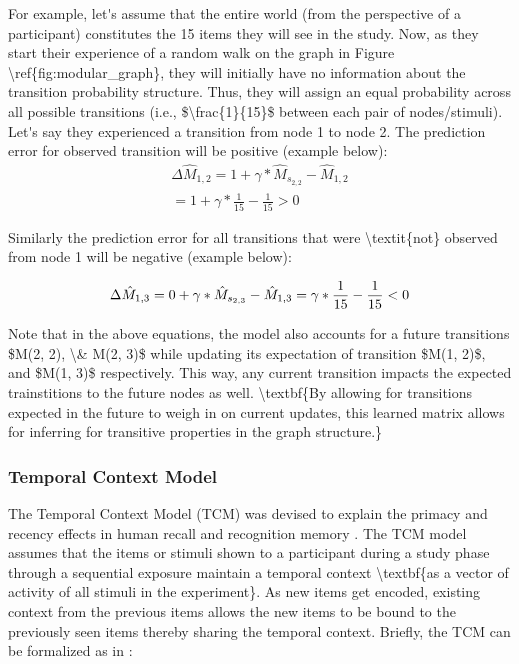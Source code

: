\ac{For example, let's assume that the entire world (from the perspective of a participant) constitutes the 15 items they will see in the study. Now, as they start their experience of a random walk on the graph in Figure \ref{fig:modular_graph}, they will initially have no information about the transition probability structure. Thus, they will assign an equal probability across all possible transitions (i.e., $\frac{1}{15}$ between each pair of nodes/stimuli). Let's say they experienced a transition from node 1 to node 2. The prediction error for observed transition will be positive (example below)}:
\begin{equation}
	\begin{aligned}
		\Delta\hat{M}_{1,2} = 1 + \gamma*\hat{M}_{s_{2, 2}} - \hat{M}_{1,2} \\
		 = 1 + \gamma*\frac{1}{15} - \frac{1}{15} > 0
	\end{aligned}
\end{equation}

\ac{Similarly the prediction error for all transitions that were \textit{not} observed from node 1 will be negative (example below)}:

\begin{equation}
	\Delta\hat{M}_{1,3} = 0 + \gamma*\hat{M}_{s_{2, 3}} - \hat{M}_{1,3} \\
		= \gamma*\frac{1}{15} - \frac{1}{15} < 0
\end{equation}

\ac{Note that in the above equations, the model also accounts for a future transitions $M(2, 2), \& M(2, 3)$ while updating its expectation of transition $M(1, 2)$, and $M(1, 3)$ respectively. This way, any current transition impacts the expected trainstitions to the future nodes as well. \textbf{By allowing for transitions expected in the future to weigh in on current updates, this learned matrix allows for inferring for transitive properties in the graph structure.}}


\subsubsection*{Temporal Context Model}
The Temporal Context Model (TCM) was devised to explain the primacy and recency effects in human recall and recognition memory \parencite{howard2005temporal}. \ac{The TCM model assumes that the items or stimuli shown to a participant during a study phase through a sequential exposure maintain a temporal context \textbf{as a vector of activity of all stimuli in the experiment}. As new items get encoded, existing context from the previous items allows the new items to be bound to the previously seen items thereby sharing the temporal context}. Briefly, the TCM can be formalized as in \cite{gershman2012successor}:

